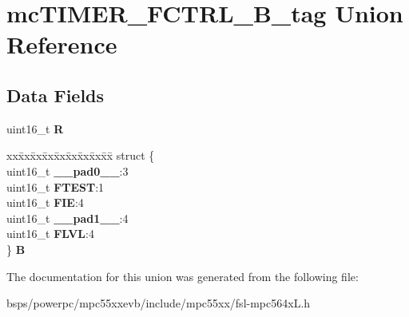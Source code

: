 \hypertarget{unionmcTIMER__FCTRL__16B__tag}{}\section{mc\+T\+I\+M\+E\+R\+\_\+\+F\+C\+T\+R\+L\+\_\+B\+\_\+tag Union Reference}
\label{unionmcTIMER__FCTRL__16B__tag}
\subsection*{Data Fields}
\begin{DoxyCompactItemize}
\item 
\mbox{\label{unionmcTIMER__FCTRL__16B__tag_a305d06fa3bbac628f742204d288b1aa9}} 
uint16\+\_\+t {\bfseries R}
\item 
\mbox{\label{unionmcTIMER__FCTRL__16B__tag_a581cf888df656977478f3c80bfb69ea5}} 
\begin{tabbing}
xx\=xx\=xx\=xx\=xx\=xx\=xx\=xx\=xx\=\kill
struct \{\\
\>uint16\_t {\bfseries \_\_pad0\_\_}:3\\
\>uint16\_t {\bfseries FTEST}:1\\
\>uint16\_t {\bfseries FIE}:4\\
\>uint16\_t {\bfseries \_\_pad1\_\_}:4\\
\>uint16\_t {\bfseries FLVL}:4\\
\} {\bfseries B}\\

\end{tabbing}\end{DoxyCompactItemize}


The documentation for this union was generated from the following file\+:\begin{DoxyCompactItemize}
\item 
bsps/powerpc/mpc55xxevb/include/mpc55xx/fsl-\/mpc564x\+L.\+h\end{DoxyCompactItemize}

